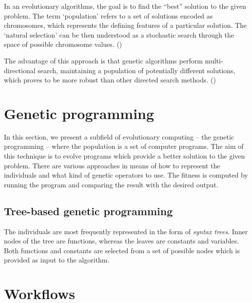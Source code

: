 In an evolutionary algorithms, the goal is to find the ``best'' solution to the given problem. The term `population' refers to a set of solutions encoded as chromosomes, which represents the defining features of a particular solution. The `natural selection' can be then understood as a stochastic search through the space of possible chromosome values. (\cite{Engelbrecht:2007:CII:1557464}) %



The advantage of this approach is that genetic algorithms perform multi-directional search, maintaining a population of potentially different solutions, which proves to be more robust than other directed search methods. (\cite{Michalewicz:1996:GAD:229930})

\section{Genetic programming}
In this section, we present a subfield of evolutionary computing -- the genetic programming -- where the population is a set of computer programs. The aim of this technique is to evolve programs which provide a better solution to the given problem. There are various approaches in means of how to represent the individuals and what kind of genetic operators to use. The fitness is computed by running the program and comparing the result with the desired output. \cite{Poli:2008:FGG:1796422}
\subsection{Tree-based genetic programming}
The individuals are most frequently represented in the form of \textit{syntax trees}. Inner nodes of the tree are functions, whereas the leaves are constants and variables. Both functions and constants are selected from a set of possible nodes which is provided as input to the algorithm.


\section{Workflows}